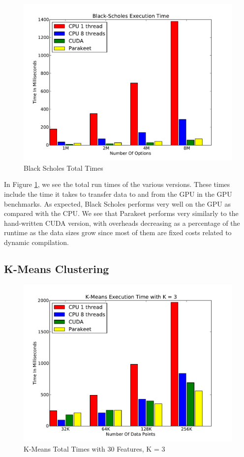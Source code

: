 \documentclass[10pt,twocolumn]{article}
\begin{document}
\begin{figure}[h!]
\includegraphics[scale=0.4]{BSWCPU.pdf}
\caption{Black Scholes Total Times}
\label{BSCPU}
\end{figure}

In Figure \ref{BSCPU}, we see the total run times of the various versions. These times include the time it takes to transfer data to and from the GPU in the GPU benchmarks.  As expected, Black Scholes performs very well on the GPU as compared with the CPU.  We see that Parakeet performs very similarly to the hand-written CUDA version, with overheads decreasing as a percentage of the runtime as the data sizes grow since most of them are fixed costs related to dynamic compilation.

\subsection{K-Means Clustering}
\label{results-k-means}

\begin{figure}
\includegraphics[scale=0.4]{KMCPUK3.pdf}
\caption{K-Means Total Times with 30 Features, K = 3}
\label{KMCPU3}
\end{figure}
\end{document}
